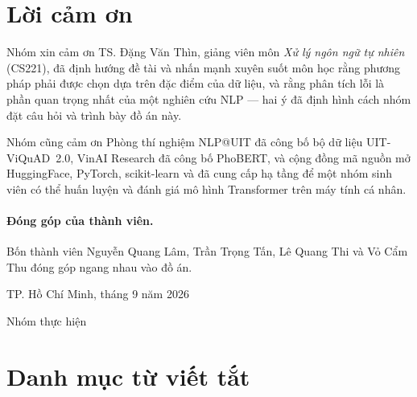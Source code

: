 
\section*{Lời cảm ơn}

Nhóm xin cảm ơn TS. Đặng Văn Thìn, giảng viên môn \emph{Xử lý ngôn ngữ tự nhiên} (CS221), đã định
hướng đề tài và nhấn mạnh xuyên suốt môn học rằng phương pháp phải được chọn dựa trên đặc điểm của dữ
liệu, và rằng phân tích lỗi là phần quan trọng nhất của một nghiên cứu NLP --- hai ý đã định hình cách
nhóm đặt câu hỏi và trình bày đồ án này.

Nhóm cũng cảm ơn Phòng thí nghiệm NLP@UIT đã công bố bộ dữ liệu UIT-ViQuAD~2.0, VinAI Research đã công
bố PhoBERT, và cộng đồng mã nguồn mở HuggingFace, PyTorch, scikit-learn và  đã cung cấp hạ tầng
để một nhóm sinh viên có thể huấn luyện và đánh giá mô hình Transformer trên máy tính cá nhân.

\paragraph{Đóng góp của thành viên.} Bốn thành viên Nguyễn Quang Lâm, Trần Trọng Tấn, Lê Quang Thi và
Vỏ Cẩm Thu đóng góp ngang nhau vào đồ án.

\vspace{1em}
\hfill TP. Hồ Chí Minh, tháng 9 năm 2026

\hfill Nhóm thực hiện

\clearpage


\clearpage
{
\tableofcontents
\clearpage
\listoffigures
{}
\vspace{1.5em}
\listoftables
{}
}

\vspace{1.5em}
\section*{Danh mục từ viết tắt}

